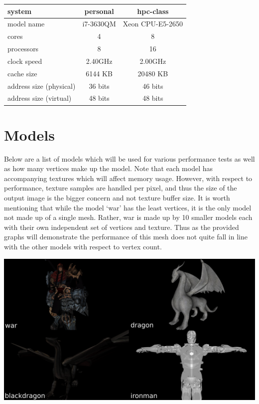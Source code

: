 \documentclass[12pt]{article}
\begin{document}
\bigbreak
\begin{center}
	\begin{tabular}{|l|c|c|}
		\hline
		system & personal & hpc-class \\ \hline \hline
		model name & i7-3630QM & Xeon CPU-E5-2650 \\ \hline
		cores & 4 & 8 \\ \hline
		processors & 8 & 16 \\ \hline
		clock speed & 2.40GHz & 2.00GHz \\ \hline
		cache size & 6144 KB & 20480 KB \\ \hline
		address size (physical) & 36 bits & 46 bits \\ \hline
		address size (virtual) & 48 bits & 48 bits \\ \hline
	\end{tabular}
\end{center}

\section*{Models}

Below are a list of models which will be used for various performance tests as well as how many
vertices make up the model. Note that each model has accompanying textures which will affect memory
usage. However, with respect to performance, texture samples are handled per pixel, and thus
the size of the output image is the bigger concern and not texture buffer size.
It is worth mentioning that while the model `war' has the least vertices, it is the only model
not made up of a single mesh. Rather, war is made up by 10 smaller models each with their own 
independent set of vertices and texture.
Thus as the provided graphs will demonstrate the performance of this mesh does not quite fall in line
with the other models with respect to vertex count.

\begin{center}
	\includegraphics[width=\textwidth]{models.png}
\end{center}
\end{document}
